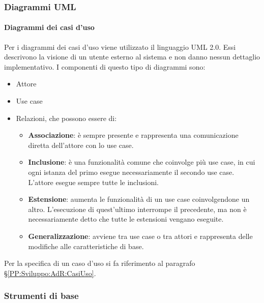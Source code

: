 		\subsubsection{Diagrammi UML}\label{PP:Sviluppo:UML}	%


		\paragraph{Diagrammi dei casi d'uso}	\label{DiagrammiCasiUso}
		Per i diagrammi dei casi d'uso viene utilizzato il linguaggio UML 2.0. Essi descrivono la visione di un utente esterno al sistema e non danno
		nessun dettaglio implementativo. I componenti di questo tipo di diagrammi sono:
		\begin{itemize}
			\item Attore
			\item Use case
			\item Relazioni, che possono essere di:
			\begin{itemize}
				\item \textbf{Associazione}: è sempre presente e rappresenta una comunicazione diretta dell'attore con lo use case.
				\item \textbf{Inclusione}: è una funzionalità comune che coinvolge più use case, in cui ogni istanza del primo esegue necessariamente il secondo use case. L'attore esegue sempre tutte le inclusioni.
				\item \textbf{Estensione}: aumenta le funzionalità di un use case coinvolgendone un altro. L'esecuzione di quest'ultimo interrompe il precedente, ma non è necessariamente detto che tutte le estensioni vengano eseguite.
				\item \textbf{Generalizzazione}: avviene tra use case o tra attori e rappresenta delle modifiche alle caratteristiche di base.
			\end{itemize}
		\end{itemize}
		Per la specifica di un caso d'uso si fa riferimento al paragrafo \S\ref{PP:Sviluppo:AdR:CasiUso}.




        \subsubsection{Strumenti di base}\label{PP:Sviluppo:Strumenti}

